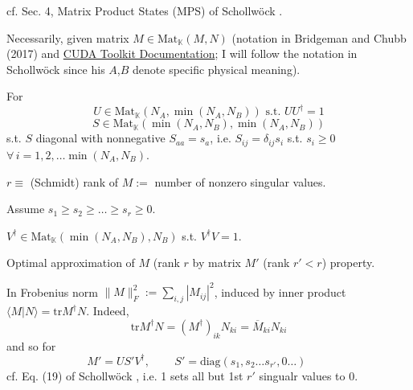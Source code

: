 \documentclass[10pt]{amsart}
\begin{document}
\begin{multicols*}{2}





cf. Sec. 4, Matrix Product States (MPS) of Schollw\"{o}ck \cite{Scho2010}.  

Necessarily, given matrix $M\in \text{Mat}_{\mathbb{K}}(M,N)$ (notation in Bridgeman and Chubb (2017) \cite{BrCh2017} and \href{http://docs.nvidia.com/cuda/cusolver/index.html}{CUDA Toolkit Documentation}; I will follow the notation in Schollw\"{o}ck \cite{Scho2010} since his $A$,$B$ denote specific physical meaning).  

For 
\[
U\in \text{Mat}_{\mathbb{K}}(N_A, \min{(N_A,N_B)}) \text{ s.t. } UU^{\dag}=1
\]
\[
S \in \text{Mat}_{\mathbb{K}}(\min{(N_A,N_B)}, \min{(N_A,N_B)} )
\]
s.t. $S$ diagonal with nonnegative $S_{aa} = s_a$, i.e. $S_{ij} = \delta_{ij}s_i$ s.t. $s_i\geq 0$ \, $\forall \, i = 1,2, \dots \min{(N_A,N_B)}$.  

$r\equiv $ (Schmidt) rank of $M :=$ number of nonzero singular values.  

Assume $s_1\geq s_2 \geq \dots \geq s_r \geq 0$.  

$V^{\dag} \in \text{Mat}_{\mathbb{K}}(\min{(N_A,N_B)},N_B)$ s.t. $V^{\dag}V=1$.  


Optimal approximation of $M$ (rank $r$ by matrix $M'$ (rank $r' <r$) property.  

In Frobenius norm $\| M \|_F^2 := \sum_{i,j} |M_{ij}|^2$, induced by inner product $\langle M | N \rangle =\text{tr}M^{\dag}N$.  Indeed, 
\[
\text{tr}M^{\dag}N = (M^{\dag})_{ik} N_{ki} = \overline{M}_{ki} N_{ki}
\]
and so for 
\begin{equation}
M'=US'V^{\dag}, \qquad \, S'=\text{diag}(s_1,s_2 \dots s_{r'}, 0 \dots ) \qquad \,
\end{equation}
cf. Eq. (19) of Schollw\"{o}ck \cite{Scho2010}, i.e. 1 sets all but 1st $r'$ singualr values to $0$.  


\end{multicols*}
\end{document}
